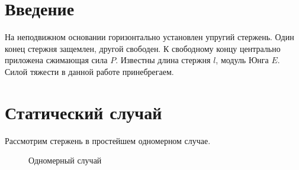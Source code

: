 \documentclass[12pt,a4paper]{article}
\begin{document}
\tableofcontents
\newpage
\section{Введение}
На неподвижном основании горизонтально установлен упругий стержень. Один конец стержня защемлен, другой свободен. К свободному концу
центрально приложена сжимающая сила $P$. Известны длина стержня $l$, модуль Юнга $E$. Силой тяжести в данной работе принебрегаем.

\newpage

\section{Статический случай}	
Рассмотрим стержень в простейшем одномерном случае.
\begin{figure}[H]
    \caption{Одномерный случай}
    \label{fig:image}
\end{figure}
\end{document}
